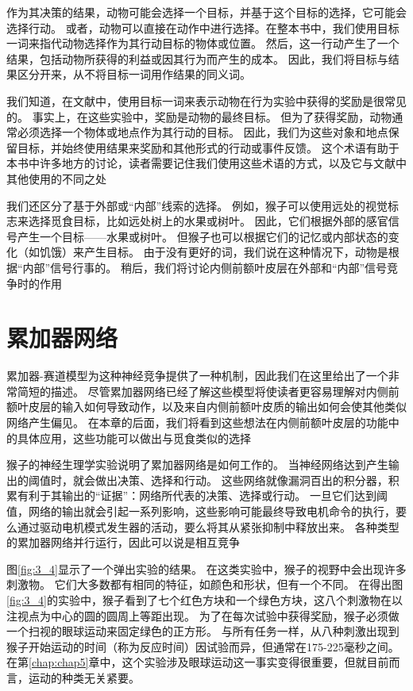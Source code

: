 作为其决策的结果，动物可能会选择一个目标，并基于这个目标的选择，它可能会选择行动。
或者，动物可以直接在动作中进行选择。在整本书中，我们使用目标一词来指代动物选择作为其行动目标的物体或位置。
然后，这一行动产生了一个结果，包括动物所获得的利益或因其行为而产生的成本。
因此，我们将目标与结果区分开来，从不将目标一词用作结果的同义词。\par


我们知道，在文献中，使用目标一词来表示动物在行为实验中获得的奖励是很常见的。
事实上，在这些实验中，奖励是动物的最终目标。
但为了获得奖励，动物通常必须选择一个物体或地点作为其行动的目标。
因此，我们为这些对象和地点保留目标，并始终使用结果来奖励和其他形式的行动或事件反馈。
这个术语有助于本书中许多地方的讨论，读者需要记住我们使用这些术语的方式，以及它与文献中其他使用的不同之处\par


我们还区分了基于外部或“内部”线索的选择\cite{Passingham et al.2010}。
例如，猴子可以使用远处的视觉标志来选择觅食目标，比如远处树上的水果或树叶。
因此，它们根据外部的感官信号产生一个目标——水果或树叶。
但猴子也可以根据它们的记忆或内部状态的变化（如饥饿）来产生目标。
由于没有更好的词，我们说在这种情况下，动物是根据“内部”信号行事的。
稍后，我们将讨论内侧前额叶皮层在外部和“内部”信号竞争时的作用\par



\section{累加器网络}

累加器-赛道模型为这种神经竞争提供了一种机制，因此我们在这里给出了一个非常简短的描述。
尽管累加器网络已经了解这些模型将使读者更容易理解对内侧前额叶皮层的输入如何导致动作，以及来自内侧前额叶皮质的输出如何会使其他类似网络产生偏见。
在本章的后面，我们将看到这些想法在内侧前额叶皮层的功能中的具体应用，这些功能可以做出与觅食类似的选择\par


猴子的神经生理学实验说明了累加器网络是如何工作的。
当神经网络达到产生输出的阈值时，就会做出决策、选择和行动。
这些网络就像漏洞百出的积分器，积累有利于其输出的“证据”：网络所代表的决策、选择或行动。
一旦它们达到阈值，网络的输出就会引起一系列影响，这些影响可能最终导致电机命令的执行，要么通过驱动电机模式发生器的活动，要么将其从紧张抑制中释放出来。
各种类型的累加器网络并行运行，因此可以说是相互竞争\par


图\ref{fig:3_4}显示了一个弹出实验的结果。
在这类实验中，猴子的视野中会出现许多刺激物。
它们大多数都有相同的特征，如颜色和形状，但有一个不同。
在得出图\ref{fig:3_4}的实验中，猴子看到了七个红色方块和一个绿色方块，这八个刺激物在以注视点为中心的圆的圆周上等距出现。
为了在每次试验中获得奖励，猴子必须做一个扫视的眼球运动来固定绿色的正方形。
与所有任务一样，从八种刺激出现到猴子开始运动的时间（称为反应时间）因试验而异，但通常在175-225毫秒之间。
在第\ref{chap:chap5}章中，这个实验涉及眼球运动这一事实变得很重要，但就目前而言，运动的种类无关紧要。\par


